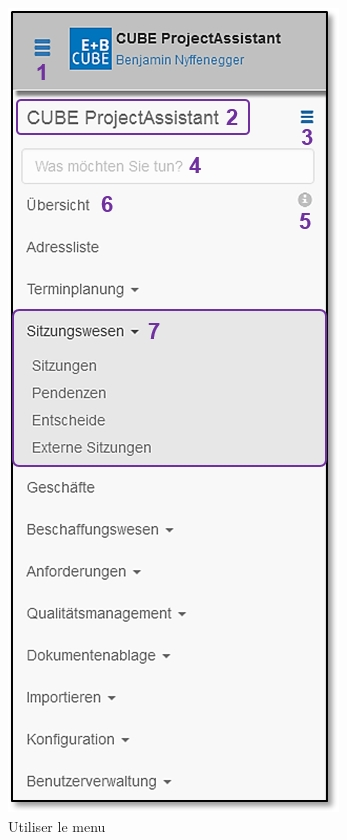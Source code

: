\begin{figure}
\begin{center}
    \includegraphics[width=1\linewidth]{../chapters/02_GettingStarted/pictures/2-5-1_Menu_Uebersicht.jpg}
  \end{center}
  \vspace{-20pt}
  \caption{Utiliser le menu}
  \vspace{-10pt}
\end{figure}

